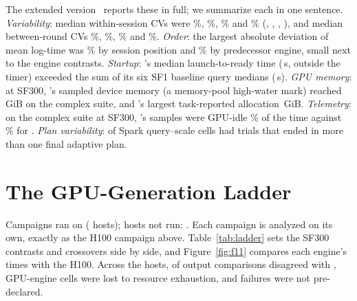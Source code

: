 \documentclass[sigconf, nonacm]{acmart}
\begin{document}
The extended version~\citep{ejiofor2026extended} reports these in full; we
summarize each in one sentence. \emph{Variability}: median within-session CVs
were \%, \%,
\% and \%
(\polarscpu{}, \polarsgpu{}, \sparkcpu{}, \sparkgpu{}), and median between-round
CVs \%, \%,
\% and \%.
\emph{Order}: the largest absolute deviation of mean log-time was
\% by session position and
\% by predecessor engine, small next to the
engine contrasts. \emph{Startup}: \sparkgpu{}'s median launch-to-ready time
(\,s, outside the timer) exceeded the sum of
its six SF1 baseline query medians
(\,s). \emph{GPU memory}: at
SF300, \polarsgpu{}'s sampled device memory (a memory-pool high-water mark)
reached \,GiB on the
complex suite, and \sparkgpu{}'s largest task-reported allocation
\,GiB. \emph{Telemetry}: on
the complex suite at SF300, \sparkgpu{}'s samples were GPU-idle
\% of the time against
\% for \polarsgpu{}. \emph{Plan
variability}:  of
 Spark query--scale cells had trials that
ended in more than one final adaptive plan.

\section{The GPU-Generation Ladder}
\label{sec:ladder}
\ifladderran
Campaigns ran on  ( hosts); hosts not
run: . Each campaign is analyzed on its own, exactly
as the H100 campaign above. Table~\ref{tab:ladder} sets the SF300 contrasts and
crossovers side by side, and Figure~\ref{fig:f11} compares each engine's times
with the H100. Across the  hosts, 
of  output comparisons disagreed with
\polarscpu{},  GPU-engine cells were
lost to resource exhaustion, and 
\polarsgpu{} failures were not pre-declared.
\end{document}
